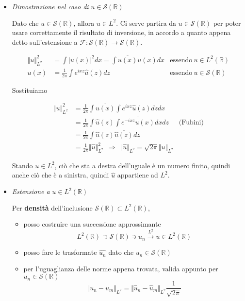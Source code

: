 \documentclass[10pt,a4paper,twoside]{book}
\begin{document}
\begin{itemize}
\item \textit{Dimostrazione nel caso di }$u\in \mathcal{S}(\mathbb{R})$

Dato che $u\in \mathcal{S}(\mathbb{R})$, allora $u\in L^{2}$. Ci serve partira da $u\in \mathcal{S}(\mathbb{R})$ per poter usare correttamente il risultato di inversione, in accordo a quanto appena detto sull'estensione a $\mathcal{F} :\mathcal{S}(\mathbb{R})\rightarrow \mathcal{S}(\mathbb{R})$.

\begin{equation*}
\begin{aligned}
\Vert u\Vert ^{2}_{L^{2}} & =\int | u( x)| ^{2} dx=\int \overline{u( x)} u( x) dx & \text{essendo} \ u\in L^{2}(\mathbb{R})\\
u( x) & =\frac{1}{2\pi }\int e^{ixz}\hat{u}( z) dz & \text{essendo} \ u\in \mathcal{S}(\mathbb{R})
\end{aligned}
\end{equation*}

Sostituiamo

\begin{equation*}
\begin{aligned}
\Vert u\Vert ^{2}_{L^{2}} & =\frac{1}{2\pi }\int \overline{u( x)}\int e^{ixz}\hat{u}( z) dzdx & \\
 & =\frac{1}{2\pi }\int \hat{u}( z)\int \overline{e^{-ixz} u( x)} dxdz & \text{(Fubini)}\\
 & =\frac{1}{2\pi }\int \hat{u}( z)\overline{\hat{u}( z)} dz & \\
 & =\frac{1}{2\pi }\Vert \hat{u}\Vert ^{2}_{L^{2}} \ \ \Rightarrow \ \ \Vert \hat{u}\Vert _{L^{2}} =\sqrt{2\pi }\Vert u\Vert _{L^{2}} & 
\end{aligned}
\end{equation*}

Stando $u\in L^{2}$, ciò che sta a destra dell'uguale è un numero finito, quindi anche ciò che è a sinistra, quindi $\hat{u}$ appartiene ad $L^{2}$.
\item \textit{Estensione a }$u\in L^{2}(\mathbb{R})$

Per \textbf{densità} dell'inclusione $\mathcal{S}(\mathbb{R}) \subset L^{2}(\mathbb{R})$,
\begin{itemize}
\item posso costruire una successione approssimante\begin{equation*}
L^{2}(\mathbb{R}) \supset \mathcal{S}(\mathbb{R}) \ni u_{n}\xrightarrow{L^{2}} u\in L^{2}(\mathbb{R})
\end{equation*}
\item posso fare le trasformate $\widehat{u_{n}}$ dato che $u_{n} \in \mathcal{S}(\mathbb{R})$
\item per l'uguaglianza delle norme appena trovata, valida appunto per $u_{n} \in \mathcal{S}(\mathbb{R})$\begin{equation*}
\Vert u_{n} -u_{m}\Vert _{L^{2}} =\Vert \hat{u}_{n} -\hat{u}_{m}\Vert _{L^{2}}\frac{1}{\sqrt{2\pi }}
\end{equation*}


\end{itemize}
\end{itemize}
\end{document}
